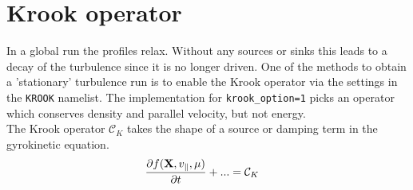 \section{Krook operator}
\label{seckrookoperator}
In a global run the profiles relax. Without any sources or sinks this leads 
to a decay of the turbulence since it is no longer driven. One of the methods
to obtain a 'stationary' turbulence run is to enable the Krook operator via the 
settings in the \texttt{KROOK} namelist. The implementation for \texttt{krook_option=1} 
picks an operator which conserves density and parallel velocity, but not 
energy. \\
The Krook operator $\mathcal{C}_K$ takes the shape of a source or damping term in the gyrokinetic equation.
\begin{align}
  \frac{\partial  f (\mathbf{X}, v_\parallel,\mu)}{\partial  t} + ... &= \mathcal{C}_K
\end{align}

